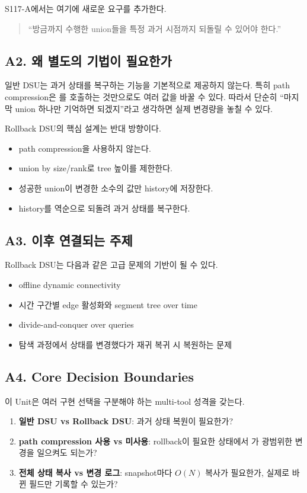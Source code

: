S117-A에서는 여기에 새로운 요구를 추가한다.

\begin{quote}
``방금까지 수행한 union들을 특정 과거 시점까지 되돌릴 수 있어야 한다.''
\end{quote}

\subsection{A2. 왜 별도의 기법이 필요한가}
일반 DSU는 과거 상태를 복구하는 기능을 기본적으로 제공하지 않는다. 특히 path compression은 를 호출하는 것만으로도 여러  값을 바꿀 수 있다. 따라서 단순히 ``마지막 union 하나만 기억하면 되겠지''라고 생각하면 실제 변경량을 놓칠 수 있다.

Rollback DSU의 핵심 설계는 반대 방향이다.
\begin{itemize}
\item path compression을 사용하지 않는다.
\item union by size/rank로 tree 높이를 제한한다.
\item 성공한 union이 변경한 소수의 값만 history에 저장한다.
\item history를 역순으로 되돌려 과거 상태를 복구한다.
\end{itemize}

\subsection{A3. 이후 연결되는 주제}
Rollback DSU는 다음과 같은 고급 문제의 기반이 될 수 있다.
\begin{itemize}
\item offline dynamic connectivity
\item 시간 구간별 edge 활성화와 segment tree over time
\item divide-and-conquer over queries
\item 탐색 과정에서 상태를 변경했다가 재귀 복귀 시 복원하는 문제
\end{itemize}

\subsection{A4. Core Decision Boundaries}
이 Unit은 여러 구현 선택을 구분해야 하는 multi-tool 성격을 갖는다.
\begin{enumerate}
\item \textbf{일반 DSU vs Rollback DSU}: 과거 상태 복원이 필요한가?
\item \textbf{path compression 사용 vs 미사용}: rollback이 필요한 상태에서 가 광범위한 변경을 일으켜도 되는가?
\item \textbf{전체 상태 복사 vs 변경 로그}: snapshot마다 $O(N)$ 복사가 필요한가, 실제로 바뀐 필드만 기록할 수 있는가?
\end{enumerate}

